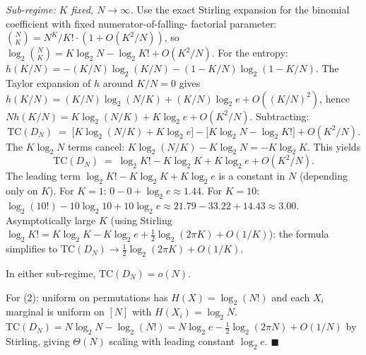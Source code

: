 \documentclass[
]{article}
\begin{document}
\emph{Sub-regime: $K$ fixed, $N \to \infty$.} Use the exact Stirling
expansion for the binomial coefficient with fixed numerator-of-falling-
factorial parameter: $\binom{N}{K} = N^K / K! \cdot (1 + O(K^2/N))$, so
$\log_2 \binom{N}{K} = K \log_2 N - \log_2 K! + O(K^2/N)$. For the
entropy: $h(K/N) = -(K/N) \log_2(K/N) - (1-K/N) \log_2(1-K/N)$. The
Taylor expansion of $h$ around $K/N = 0$ gives
$h(K/N) = (K/N) \log_2(N/K) + (K/N) \log_2 e + O((K/N)^2)$, hence
$N h(K/N) = K \log_2(N/K) + K \log_2 e + O(K^2/N)$. Subtracting:
\[
\mathrm{TC}(D_N) \;=\; \bigl[ K \log_2(N/K) + K \log_2 e \bigr] -
\bigl[ K \log_2 N - \log_2 K! \bigr] + O(K^2/N).
\]
The $K \log_2 N$ terms cancel: $K \log_2(N/K) - K \log_2 N = -K \log_2 K$.
This yields
\[
\mathrm{TC}(D_N) \;=\; \log_2 K! - K \log_2 K + K \log_2 e + O(K^2/N).
\]
The leading term $\log_2 K! - K \log_2 K + K \log_2 e$ is a constant
in $N$ (depending only on $K$). For $K = 1$: $0 - 0 + \log_2 e \approx
1.44$. For $K = 10$: $\log_2(10!) - 10 \log_2 10 + 10 \log_2 e \approx
21.79 - 33.22 + 14.43 \approx 3.00$. Asymptotically large $K$ (using
Stirling $\log_2 K! = K \log_2 K - K \log_2 e + \tfrac{1}{2} \log_2(2 \pi K)
+ O(1/K)$): the formula simplifies to $\mathrm{TC}(D_N) \to \tfrac{1}{2}
\log_2(2 \pi K) + O(1/K)$.

In either sub-regime, $\mathrm{TC}(D_N) = o(N)$.

For (2): uniform on permutations has $H(X) = \log_2(N!)$ and each
$X_i$ marginal is uniform on $[N]$ with $H(X_i) = \log_2 N$.
$\mathrm{TC}(D_N) = N \log_2 N - \log_2(N!) = N \log_2 e - \tfrac{1}{2}
\log_2(2 \pi N) + O(1/N)$ by Stirling, giving $\Theta(N)$ scaling
with leading constant $\log_2 e$. \hfill$\blacksquare$
\end{document}
